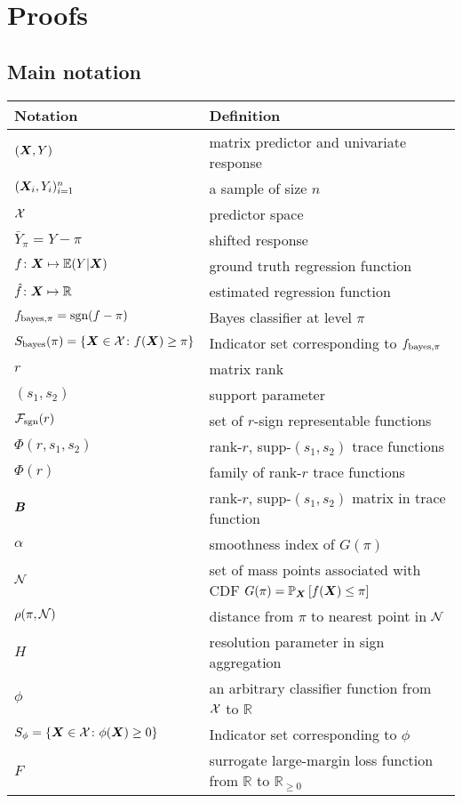 \documentclass[11pt]{article}
\theoremstyle{plain}
\theoremstyle{definition}
\def\caliF{\tF_{\textup{sgn}}}
\def\sign{\textup{sgn}}
\def\bayesS{S_{\textup{bayes}}}
\def\bayespif{f_{\textup{bayes},\pi}}
\def\caliF{\tF_{\textup{sgn}}}
\def\shift{\bar Y_\pi}
\begin{document}
\section{Proofs}\label{sec:proofs}
\subsection{Main notation}
\begin{table}[ht]
\begin{tabular}{l|l}
Notation & Definition \\
\hline
$(\bm X,Y)$ & matrix predictor and univariate response\\ 
$(\bm X_i,Y_i)_{i=1}^n$ & a sample of size $n$\\
$\mathcal{X}$ & predictor space \\
$\shift=Y-\pi$ & shifted response\\
$f\colon \bm X\mapsto \mathbb{E}(Y|\bm X)$ & ground truth regression function \\
$\hat f\colon \bm X\mapsto \mathbb{R}$ & estimated regression function \\
$\bayespif=\sign(f-\pi)$ & Bayes classifier at level $\pi$\\
$\bayesS(\pi)=\{\mX\in\tX\colon f(\mX)\geq \pi\}$ & Indicator set corresponding to $\bayespif$\\
$r$& matrix rank\\
$(s_1,s_2)$ & support parameter \\
$\caliF(r)$ & set of $r$-sign representable functions\\
$\Phi(r,s_1,s_2)$ & rank-$r$, supp-$(s_1,s_2)$ trace functions\\
$\Phi(r)$ & family of rank-$r$ trace functions\\
$\bm B$ & rank-$r$, supp-$(s_1,s_2)$ matrix in trace function\\
$\alpha$ & smoothness index of $G(\pi)$\\
$\mathcal{N}$ & set of mass points associated with CDF $G(\pi)=\mathbb{P}_{\bm X}\left[f(\bm X)\leq \pi\right]$ \\
$\rho(\pi,\mathcal{N})$ & distance from $\pi$ to nearest point in $\mathcal{N}$\\
$H$ & resolution parameter in sign aggregation \\
$\phi$ & an arbitrary classifier function from $\mathcal{X}$ to $\mathbb{R}$\\
$S_{\phi} = \{\bm X\in\mathcal{X}\colon \phi(\bm X)\geq 0\}$ & Indicator set corresponding to $\phi$\\
$F$ & surrogate large-margin loss function from $\mathbb{R}$ to $\mathbb{R}_{\geq 0}$\\

\end{tabular}
\end{table}
\end{document}
